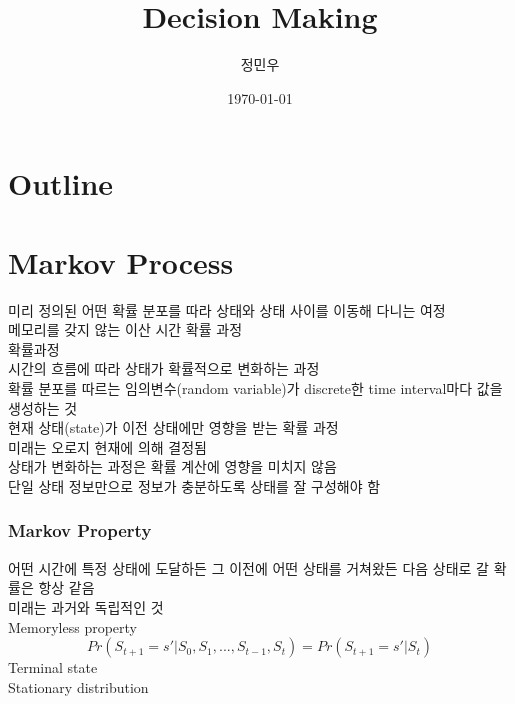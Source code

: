 \documentclass{beamer}
\begin{document}
\begin{frame}
	\title{Decision Making}
	\author{정민우}
	\date{\today}
	\titlepage
\end{frame}

\section*{Outline}
\begin{frame}
\tableofcontents
\end{frame}

\section{Markov Process}
\begin{frame}
	미리 정의된 어떤 확률 분포를 따라 상태와 상태 사이를 이동해 다니는 여정\\
	메모리를 갖지 않는 이산 시간 확률 과정\\
	확률과정\\
	시간의 흐름에 따라 상태가 확률적으로 변화하는 과정\\
	확률 분포를 따르는 임의변수(random variable)가 discrete한 time interval마다 값을 생성하는 것\\
	현재 상태(state)가 이전 상태에만 영향을 받는 확률 과정\\
	미래는 오로지 현재에 의해 결정됨\\
	상태가 변화하는 과정은 확률 계산에 영향을 미치지 않음\\
	단일 상태 정보만으로 정보가 충분하도록 상태를 잘 구성해야 함\\
	
	\begin{figure}
	\end{figure}
\end{frame}

\begin{frame}
	\frametitle{Markov Property}
		어떤 시간에 특정 상태에 도달하든 그 이전에 어떤 상태를 거쳐왔든 다음 상태로 갈 확률은 항상 같음\\
		미래는 과거와 독립적인 것\\
		Memoryless property\\
		\begin{equation}\label{markov property}
			Pr(S_{t+1} = s' | S_0, S_1, ..., S_{t-1}, S_t) = Pr(S_{t+1} = s' | S_t)
		\end{equation}
		Terminal state\\
		Stationary distribution\\
\end{frame}
\end{document}
